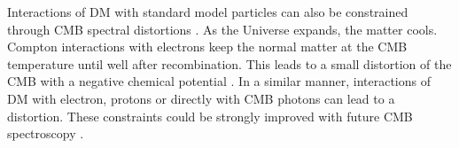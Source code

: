 Interactions of DM with standard model particles can also be constrained through CMB spectral distortions \citep{Yacine2015DM}. As the Universe expands, the matter cools. Compton interactions with electrons keep the normal matter at the CMB temperature until well after recombination. This leads to a small distortion of the CMB with a negative chemical potential \citep{Chluba2011therm}. In a similar manner, interactions of DM with electron, protons or directly with CMB photons can lead to a distortion. These constraints could be strongly improved with future CMB spectroscopy \citep{Yacine2015DM}.






